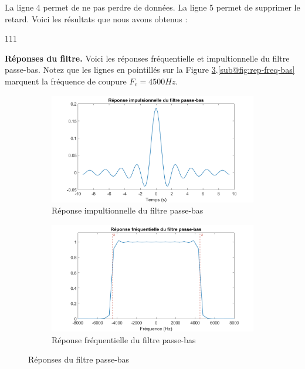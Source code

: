 La ligne 4 permet de ne pas perdre de données. La ligne 5 permet de supprimer le retard.
Voici les résultats que nous avons obtenus :
\begin{dinglist}{111}
   \item \textbf{Réponses du filtre.}
   Voici les réponses fréquentielle et impultionnelle du filtre passe-bas.
   Notez que les lignes en pointillés sur la Figure \ref{fig : rep-bas}.\ref{sub@fig:rep-freq-bas} marquent la fréquence de coupure $F_c = 4500 Hz$.
   \begin{figure}[H]
      \centering
      \begin{subfigure}{0.5\textwidth}
         \centering
         \includegraphics[width=\textwidth]{partie-2/sous-partie-3/2.3.3.1.png}
         \caption{Réponse impultionnelle du filtre passe-bas} \label{fig:rep-imp-bas}
      \end{subfigure}%
      \begin{subfigure}{0.5\textwidth}
         \centering
         \includegraphics[width=\textwidth]{partie-2/sous-partie-3/2.3.3.2.png}
         \caption{Réponse fréquentielle du filtre passe-bas}\label{fig:rep-freq-bas}
      \end{subfigure}
      \caption{Réponses du filtre passe-bas \label{fig : rep-bas}}

\end{figure}
\end{dinglist}

